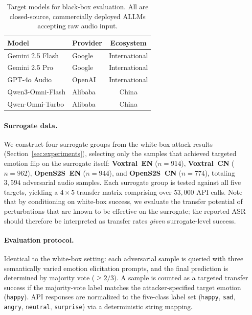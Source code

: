 \begin{table}[t]
\centering
\small
\caption{Target models for black-box evaluation. All are closed-source, commercially deployed ALLMs accepting raw audio input.}
\label{tab:bb_targets}
\setlength{\tabcolsep}{5pt}
\begin{tabular}{llc}
\toprule
\textbf{Model} & \textbf{Provider} & \textbf{Ecosystem} \\
\midrule
Gemini 2.5 Flash     & Google   & International \\
Gemini 2.5 Pro       & Google   & International \\
GPT-4o Audio         & OpenAI   & International \\
Qwen3-Omni-Flash     & Alibaba  & China \\
Qwen-Omni-Turbo      & Alibaba  & China \\
\bottomrule
\end{tabular}
\end{table}

\paragraph{Surrogate data.}
We construct four surrogate groups from the white-box attack results (Section~\ref{sec:experiments}), selecting only the samples that achieved targeted emotion flip on the surrogate itself:
\textbf{Voxtral~EN} ($n{=}914$), \textbf{Voxtral~CN} ($n{=}962$), \textbf{OpenS2S~EN} ($n{=}944$), and \textbf{OpenS2S~CN} ($n{=}774$), totaling $3{,}594$ adversarial audio samples.
Each surrogate group is tested against all five targets, yielding a $4 \times 5$ transfer matrix comprising over $53{,}000$ API calls.
Note that by conditioning on white-box success, we evaluate the transfer potential of perturbations that are known to be effective on the surrogate; the reported ASR should therefore be interpreted as transfer rates \emph{given} surrogate-level success.

\paragraph{Evaluation protocol.}
Identical to the white-box setting: each adversarial sample is queried with three semantically varied emotion elicitation prompts, and the final prediction is determined by majority vote ($\geq 2/3$).
A sample is counted as a targeted transfer success if the majority-vote label matches the attacker-specified target emotion (\texttt{happy}).
API responses are normalized to the five-class label set (\texttt{happy}, \texttt{sad}, \texttt{angry}, \texttt{neutral}, \texttt{surprise}) via a deterministic string mapping.

